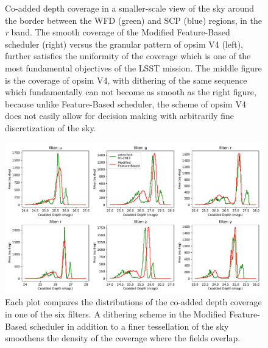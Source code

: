 \documentclass[12pt]{aastex62}
\theoremstyle{definition}
\begin{document}
\begin{figure}
\caption{Co-added depth coverage in a smaller-scale view of the sky around the border between the WFD (green) and SCP (blue) regions, in the \textit{r} band. The smooth coverage of the Modified Feature-Based scheduler (right) versus the granular pattern of opsim V4 (left), further satisfies the uniformity of the coverage which is one of the most fundamental objectives of the LSST mission. The middle figure is the coverage of opsim V4, with dithering of the same sequence which fundamentally can not become as smooth as the right figure, because unlike Feature-Based scheduler, the scheme of opsim V4 does not easily allow for decision making with arbitrarily fine discretization of the sky.}\label{fig_zoomin_r}
\end{figure}



\begin{figure}[h!]
\centering
\includegraphics[width=1.0\linewidth]{Co_addedHist10yrs.pdf}
\caption{Each plot compares the distributions of the co-added depth coverage in one of the six filters. A dithering scheme in the Modified Feature-Based scheduler in addition to a finer tessellation of the sky smoothens the density of the coverage where the fields overlap.}
\label{fig_10yrs_hist}
\end{figure}
\end{document}
